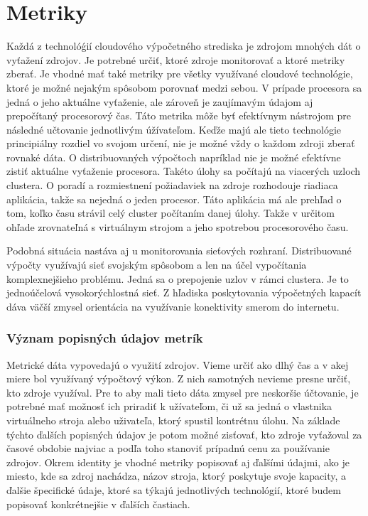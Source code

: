 \documentclass[11pt,final,oneside]{fithesis}
\begin{document}
\chapter{Metriky}
Každá z technolóǵií cloudového výpočetného strediska je zdrojom mnohých dát o vyťažení zdrojov. Je potrebné určiť, ktoré zdroje monitorovať a ktoré metriky zberať. Je vhodné mať také metriky pre všetky využívané cloudové technológie, ktoré je možné
nejakým spôsobom porovnať medzi sebou. V prípade procesora sa jedná o jeho aktuálne vyťaženie, ale zároveň je zaujímavým údajom aj prepočítaný procesorový čas. Táto metrika môže byť efektívnym
nástrojom pre následné učtovanie jednotlivým úžívateľom. Keďže majú ale tieto technológie principiálny rozdiel vo svojom určení, nie je možné vždy o každom zdroji zberať rovnaké dáta. 
O distribuovaných výpočtoch napríklad nie je možné efektívne zistiť aktuálne vyťaženie procesora. Takéto úlohy sa počítajú na viacerých uzloch clustera. O poradí a rozmiestnení požiadaviek na zdroje
rozhodouje riadiaca aplikácia, takže sa nejedná o jeden procesor. Táto aplikácia má ale prehľad o tom, koľko času strávil celý cluster počítaním danej úlohy. Takže v určitom ohľade zrovnateľná s virtuálnym
strojom a jeho spotrebou procesorového času.

Podobná situácia nastáva aj u monitorovania sieťových rozhraní. Distribuované výpočty využívajú sieť svojským spôsobom a len na účel vypočítania komplexnejšieho problému. Jedná sa o prepojenie
uzlov v rámci clustera. Je to jednoúčelová vysokorýchlostná sieť. Z hľadiska poskytovania výpočetných kapacít dáva väčší zmysel orientácia na využívanie konektivity smerom do internetu. 

\subsection{Význam popisných údajov metrík}
Metrické dáta vypovedajú o využití zdrojov. Vieme určiť ako dlhý čas a v akej miere bol využívaný výpočtový výkon. Z nich samotných nevieme presne určiť, kto zdroje využíval. Pre to aby mali tieto dáta zmysel 
pre neskoršie účtovanie, je potrebné mať možnosť ich priradiť k užívateľom, či už sa jedná o vlastnika virtuálneho stroja alebo uživateľa, ktorý spustil kontrétnu úlohu. Na základe týchto ďalších popisných  údajov je potom 
možné zisťovať, kto zdroje vyťažoval za časové obdobie najviac a podľa toho stanoviť prípadnú cenu za používanie zdrojov. Okrem identity je vhodné metriky popisovať aj ďalšími údajmi, ako je miesto, kde
sa zdroj nachádza, názov stroja, ktorý poskytuje svoje kapacity, a ďalšie špecifické údaje, ktoré sa týkajú jednotlivých technológií, ktoré budem popisovať konkrétnejšie v ďalších častiach.
\end{document}
